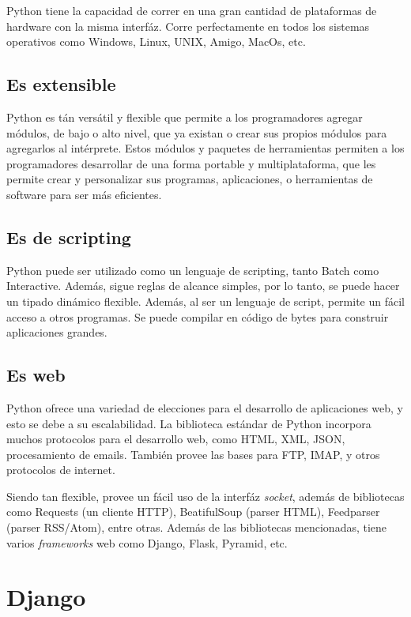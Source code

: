 Python tiene la capacidad de correr en una gran cantidad de plataformas de hardware con la misma interfáz. Corre perfectamente en todos los sistemas operativos como Windows, Linux, UNIX, Amigo, MacOs, etc.

\subsection[Es extensible]{Es extensible}

Python es tán versátil y flexible que permite a los programadores agregar módulos, de bajo o alto nivel, que ya existan o crear sus propios módulos para agregarlos al intérprete. Estos módulos y paquetes de herramientas permiten a los programadores desarrollar de una forma portable y multiplataforma, que les permite crear y personalizar sus programas, aplicaciones, o herramientas de software para ser más eficientes. 

\subsection[Es de scripting]{Es de scripting}
Python puede ser utilizado como un lenguaje de scripting, tanto Batch como Interactive. Además, sigue reglas de alcance simples, por lo tanto, se puede hacer un tipado dinámico flexible. Además, al ser un lenguaje de script, permite un fácil acceso a otros programas. Se puede compilar en código de bytes para construir aplicaciones grandes.

\subsection[Es web]{Es web}
Python ofrece una variedad de elecciones para el desarrollo de aplicaciones web, y esto se debe a su escalabilidad. La biblioteca estándar de Python incorpora muchos protocolos para el desarrollo web, como HTML, XML, JSON, procesamiento de emails. También provee las bases para FTP, IMAP, y otros protocolos de internet.

Siendo tan flexible, provee un fácil uso de la interfáz \textit{socket}, además de bibliotecas como Requests (un cliente HTTP), BeatifulSoup (parser HTML), Feedparser (parser RSS/Atom), entre otras. Además de las bibliotecas mencionadas, tiene varios \textit{frameworks} web como Django, Flask, Pyramid, etc. 


\section[Django]{Django}

